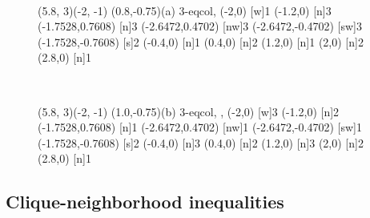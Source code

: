 \begin{figure}[h]
  \centering ~~~~~~~~~~~
\begin{graph}(5.8, 3)(-2, -1)
	\freetext(0.8,-0.75){(a) 3-eqcol, }
	(-2,0)
	{1}
	(-1.2,0)
	{3}
	(-1.7528,0.7608)
	{3}
	(-2.6472,0.4702)
	[nw]{3}
	(-2.6472,-0.4702)
	[sw]{3}
	(-1.7528,-0.7608)
	{2}
	(-0.4,0)
	{1}
	(0.4,0)
	{2}
	(1.2,0)
	{1}
	(2,0)
	{2}
	(2.8,0)
	{1}
\end{graph}~~~~~~~
\begin{graph}(5.8, 3)(-2, -1)
	\freetext(1.0,-0.75){(b) 3-eqcol, , }
	(-2,0)
	{3}
	(-1.2,0)
	{2}
	(-1.7528,0.7608)
	{1}
	(-2.6472,0.4702)
	[nw]{1}
	(-2.6472,-0.4702)
	[sw]{1}
	(-1.7528,-0.7608)
	{2}
	(-0.4,0)
	{3}
	(0.4,0)
	{2}
	(1.2,0)
	{3}
	(2,0)
	{2}
	(2.8,0)
	{1}
\end{graph}
  \caption{}
  \label{minigraph3}
\end{figure}

\subsection{Clique-neighborhood inequalities}

